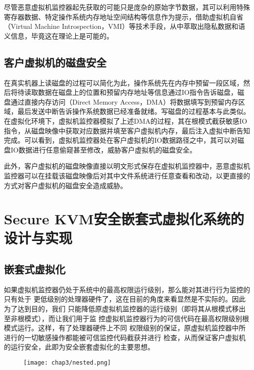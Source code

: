 尽管恶意虚拟机监控器起先获取的可能只是庞杂的原始字节数据，其可以利用特殊寄存器数据、特定操作系统内存地址空间结构等信息作为提示，借助虚拟机自省（Virtual Machine Introspection，VMI）等技术手段，从中萃取出隐私数据和语义信息，毕竟这在理论上是可能的。

\subsection{客户虚拟机的磁盘安全}

在真实机器上读磁盘的过程可以简化为此，操作系统先在内存中预留一段区域，然后将待读取数据在磁盘上的位置和预留内存地址等信息通过IO指令告诉磁盘，磁盘通过直接内存访问（Direct Memory Access，DMA）将数据填写到预留内存区域，最后发送中断告诉操作系统数据已经准备就绪。写磁盘的过程基本与此类似。在虚拟化环境下，虚拟机监控器模拟了上述DMA的过程，其在根模式截获敏感IO指令，从磁盘映像中获取对应数据并填至客户虚拟机内存，最后注入虚拟中断告知完成。可以看到，虚拟机监控器处在客户虚拟机的IO数据路径之中，其可以对磁盘IO数据进行任意偷窥甚至修改，威胁客户虚拟机的磁盘安全。

此外，客户虚拟机的磁盘映像直接以明文形式保存在虚拟机监控器中，恶意虚拟机监控器可以在挂载该磁盘映像后对其中文件系统进行任意查看和改动，以更直接的方式对客户虚拟机的磁盘安全造成威胁。



\section{Secure KVM安全嵌套式虚拟化系统的设计与实现}

\subsection{嵌套式虚拟化}

如果虚拟机监控器仍处于系统中的最高权限运行级别，那么能对其进行行为监控的只有处于
更低级别的处理器硬件了，这在目前的角度来看显然是不实际的。因此为了达到目的，我们
只能降低原虚拟机监控器的运行级别（即将其从根模式移出至非根模式），而让我们用于监
控虚拟机监控器行为的可信代码在最高权限级别根模式运行。这样，有了处理器硬件上不同
权限级别的保证，原虚拟机监控器中所进行的一切敏感操作都能被可信监控代码截获并进行
检查，从而保证客户虚拟机的运行安全，此即为安全嵌套虚拟化的主要思想。

\begin{figure}[!htp]
  \centering
  \texttt{[image: chap3/nested.png]}
\end{figure}


